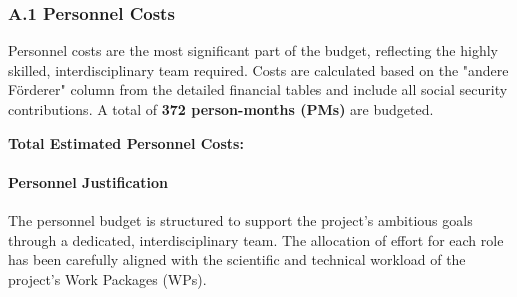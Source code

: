 \documentclass[11pt, a4paper]{article}
\begin{document}
\subsubsection*{A.1 Personnel Costs}
Personnel costs are the most significant part of the budget, reflecting the highly skilled, interdisciplinary team required. Costs are calculated based on the "andere Förderer" column from the detailed financial tables and include all social security contributions. A total of \textbf{372 person-months (PMs)} are budgeted.

\textbf{Total Estimated Personnel Costs: }

\paragraph{Personnel Justification}
The personnel budget is structured to support the project's ambitious goals through a dedicated, interdisciplinary team. The allocation of effort for each role has been carefully aligned with the scientific and technical workload of the project's Work Packages (WPs).
\end{document}
